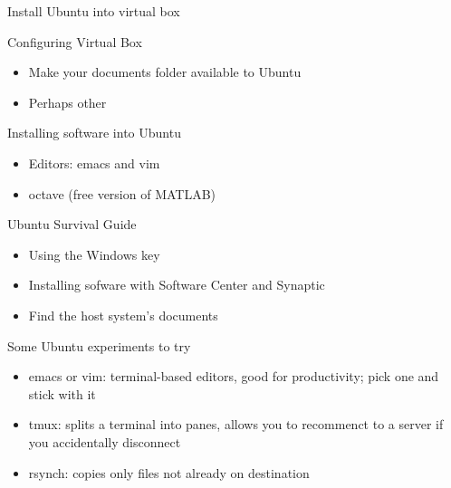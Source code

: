 \documentclass{beamer} %
\begin{document}
\begin{frame}{Install Ubuntu into virtual box}

\end{frame}

\begin{frame}{Configuring Virtual Box}
  \begin{itemize}
    \item Make your documents folder available to Ubuntu
    \item Perhaps other
  \end{itemize}
\end{frame}

\begin{frame}{Installing software into Ubuntu}
  \begin{itemize}
    \item Editors: emacs and vim
    \item octave (free version of MATLAB)
  \end{itemize}
\end{frame}

\begin{frame}{Ubuntu Survival Guide}
  \begin{itemize}
    \item Using the Windows key
    \item Installing sofware with Software Center and Synaptic
    \item Find the host system's documents  
  \end{itemize}
\end{frame} 

\begin{frame}{Some Ubuntu experiments to try}
  \begin{itemize}
    \item emacs or vim: terminal-based editors, good for productivity;
      pick one and stick with it
    \item tmux: splits a terminal into panes, allows you to recommenct
      to a server if you accidentally disconnect
    \item rsynch: copies only files not already on destination
  \end{itemize}
\end{frame}
  
\end{document}
